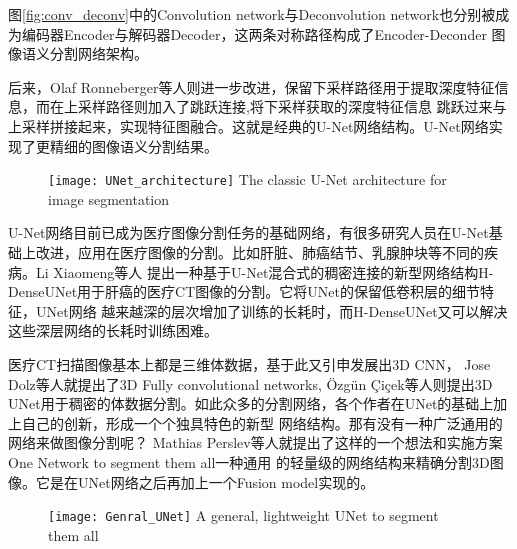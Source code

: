 	图\ref{fig:conv_deconv}中的Convolution network与Deconvolution network也分别被成为编码器Encoder与解码器Decoder，这两条对称路径构成了Encoder-Deconder
	图像语义分割网络架构。
	
	后来，Olaf Ronneberger等人\cite{ronneberger2015u}则进一步改进，保留下采样路径用于提取深度特征信息，而在上采样路径则加入了跳跃连接,将下采样获取的深度特征信息
	跳跃过来与上采样拼接起来，实现特征图融合。这就是经典的U-Net网络结构。U-Net网络实现了更精细的图像语义分割结果。
	
	\begin{figure}[!htp]
		\centering
		\texttt{[image: UNet\_architecture]}
			{The classic U-Net architecture for image segmentation}
		\label{fig:UNet}
	\end{figure}
	
	U-Net网络目前已成为医疗图像分割任务的基础网络，有很多研究人员在U-Net基础上改进，应用在医疗图像的分割。比如肝脏、肺癌结节、乳腺肿块等不同的疾病。Li Xiaomeng等人
	\cite{Li2017HDenseUNetHD}提出一种基于U-Net混合式的稠密连接的新型网络结构H-DenseUNet用于肝癌的医疗CT图像的分割。它将UNet的保留低卷积层的细节特征，UNet网络
	越来越深的层次增加了训练的长耗时，而H-DenseUNet又可以解决这些深层网络的长耗时训练困难。
	
	医疗CT扫描图像基本上都是三维体数据，基于此又引申发展出3D CNN， Jose Dolz等人\cite{Dolze3DFCN}就提出了3D Fully convolutional networks, {\"O}zg{\"u}n {\c{C}}i{\c{c}}ek等人\cite{cciccek20163d}则提出3D UNet用于稠密的体数据分割。如此众多的分割网络，各个作者在UNet的基础上加上自己的创新，形成一个个独具特色的新型
	网络结构。那有没有一种广泛通用的网络来做图像分割呢？ Mathias Perslev等人\cite{PerslevGeneralUNetFusion}就提出了这样的一个想法和实施方案
	One Network to segment them all一种通用	的轻量级的网络结构来精确分割3D图像。它是在UNet网络之后再加上一个Fusion model实现的。
	\begin{figure}[!htp]
		\centering
		\texttt{[image: Genral\_UNet]}
			{A general, lightweight UNet to segment them all}
		\label{fig:Genral_UNet}
	\end{figure}
	
